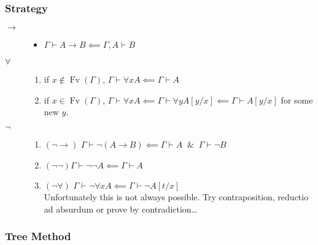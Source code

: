 \documentclass[UTF8,aspectratio=43,11pt,colorlinks,compress,openany]{beamer}%
\begin{document}
\begin{frame}\frametitle{Strategy}
	\begin{description}
		\item[$\to$] 
		\begin{itemize}
			\item $\Gamma\vdash A\to B\impliedby\Gamma, A\vdash B$
		\end{itemize}
		\item[$\forall$]
		\begin{enumerate}
			\item if $x\notin \operatorname{Fv}(\Gamma)$, $\Gamma\vdash\forall x A\impliedby\Gamma\vdash A$
			\item if $x\in \operatorname{Fv}(\Gamma)$, $\Gamma\vdash\forall x A\impliedby\Gamma\vdash\forall y A[y/x]\impliedby\Gamma\vdash A[y/x]$ for some new $y$.
		\end{enumerate}
		\item[$\neg$]
		\begin{enumerate}
			\item $(\neg\to)$\quad
			$\Gamma\vdash\neg(A\to B)\impliedby\Gamma\vdash A\;\;\&\;\;\Gamma\vdash\neg B$
			\item $(\neg\neg)$\quad $\Gamma\vdash\neg\neg A\impliedby\Gamma\vdash A$
			\item $(\neg\forall)$\quad
			$\Gamma\vdash\neg\forall x A\impliedby\Gamma\vdash\neg A[t/x]$\\ Unfortunately this is not always possible. Try contraposition, reductio ad absurdum or prove by contradiction\dots
		\end{enumerate}
	\end{description}
\end{frame}

\subsubsection{Tree Method}
\end{document}
